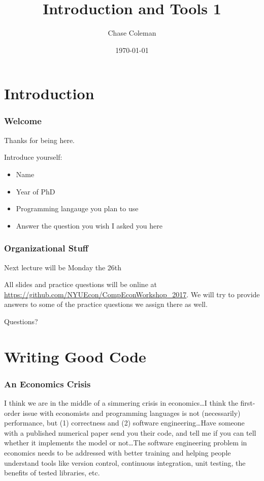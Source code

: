 \documentclass[10pt]{beamer}
\title{Introduction and Tools 1}
\author{Chase Coleman}
\institute{NYU Stern}
\date[]{\today}
\begin{document}
\begin{frame}
  \thispagestyle{empty}
  \titlepage
\end{frame}


\section{Introduction}

\begin{frame} \frametitle{Welcome}

  Thanks for being here.

  Introduce yourself:
  \begin{itemize}
    \item Name
    \item Year of PhD
    \item Programming langauge you plan to use
    \item Answer the question you wish I asked you here
  \end{itemize}
\end{frame}

\begin{frame} \frametitle{Organizational Stuff}
  Next lecture will be Monday the 26th

  \vspace{0.5cm}

  All slides and practice questions will be online at \url{https://github.com/NYUEcon/CompEconWorkshop_2017}. We will try to provide answers to some of the practice questions we assign there as well.

  \vspace{0.5cm}

  Questions?

\end{frame}

\section{Writing Good Code}

\begin{frame} \frametitle{An Economics Crisis}

  \begin{displayquote}
    I think we are in the middle of a simmering crisis in economics\dots I think the first-order issue with economists and programming languages is not (necessarily) performance, but (1) correctness and (2) software engineering\dots Have someone with a published numerical paper send you their code, and tell me if you can tell whether it implements the model or not\dots The software engineering problem in economics needs to be addressed with better training and helping people understand tools like version control, continuous integration, unit testing, the benefits of tested libraries, etc.
  \end{displayquote}

\end{frame}
\end{document}
